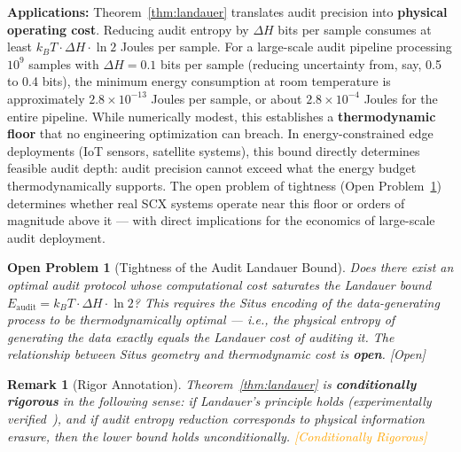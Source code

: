 \documentclass[12pt,a4paper]{article}
\newtheorem{remark}[theorem]{Remark}
\newtheorem{openproblem}[theorem]{Open Problem}
\newcommand{\conditionallyrigorous}{\textcolor{orange}{\small\textsf{[Conditionally Rigorous]}}}
\newcommand{\openquest}{\textcolor{red!70!black}{\small\textsf{[Open]}}}
\begin{document}
\medskip\noindent
\textbf{Applications:}
Theorem~\ref{thm:landauer} translates audit precision into \textbf{physical operating cost}. Reducing audit entropy by $\Delta H$ bits per sample consumes at least $k_B T\cdot\Delta H\cdot\ln 2$ Joules per sample. For a large-scale audit pipeline processing $10^9$ samples with $\Delta H=0.1$ bits per sample (reducing uncertainty from, say, 0.5 to 0.4 bits), the minimum energy consumption at room temperature is approximately $2.8\times10^{-13}$ Joules per sample, or about $2.8\times10^{-4}$ Joules for the entire pipeline. While numerically modest, this establishes a \textbf{thermodynamic floor} that no engineering optimization can breach. In energy-constrained edge deployments (IoT sensors, satellite systems), this bound directly determines feasible audit depth: audit precision cannot exceed what the energy budget thermodynamically supports. The open problem of tightness (Open Problem~\ref{prob:landauer-tight}) determines whether real SCX systems operate near this floor or orders of magnitude above it --- with direct implications for the economics of large-scale audit deployment.

\begin{openproblem}[Tightness of the Audit Landauer Bound]
\label{prob:landauer-tight}
Does there exist an optimal audit protocol whose computational cost \emph{saturates} the Landauer bound $E_{\mathrm{audit}} = k_B T \cdot \Delta H \cdot \ln 2$? This requires the Situs encoding of the data-generating process to be thermodynamically optimal --- i.e., the physical entropy of generating the data exactly equals the Landauer cost of auditing it. The relationship between Situs geometry and thermodynamic cost is \textbf{open}. \openquest
\end{openproblem}

\begin{remark}[Rigor Annotation]
Theorem~\ref{thm:landauer} is \textbf{conditionally rigorous} in the following sense: if Landauer's principle holds (experimentally verified~\citep{berut2012experimental}), and if audit entropy reduction corresponds to physical information erasure, then the lower bound holds unconditionally. \conditionallyrigorous
\end{remark}
\end{document}
